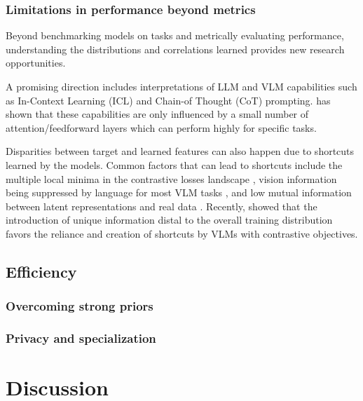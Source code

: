 
\subsubsection{Limitations in performance beyond metrics}

Beyond benchmarking models on tasks and metrically evaluating performance, understanding the distributions and correlations learned provides new research opportunities. 

A promising direction includes interpretations of LLM and VLM capabilities such as In-Context Learning (ICL) \citep{brown2020language,hoffmann2022empirical} and Chain-of Thought (CoT) \citep{wei2022chain} prompting. \citet{bansal2023rethinking} has shown that these capabilities are only influenced by a small number of attention/feedforward layers which can perform highly for specific tasks.  


Disparities between target and learned features can also happen due to shortcuts learned by the models. Common factors that can lead to shortcuts include
the multiple local minima in the contrastive losses landscape \citep{robinson2021can}, vision information being suppressed by language for most VLM tasks \citep{li2023addressing}, and low mutual information between latent representations and real data \citep{adnan2022monitoring}. Recently, \citet{bleeker2024demonstrating} showed that the introduction of unique information distal to the overall training distribution favors the reliance and creation of shortcuts by VLMs with contrastive objectives.



\subsection{Efficiency}
\label{sec:outlook::efficiency}

\subsubsection{Overcoming strong priors}

\subsubsection{Privacy and specialization}



\section{Discussion}
\label{sec:discussion}